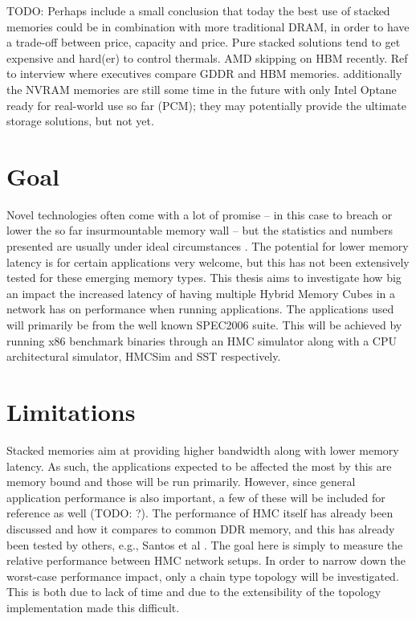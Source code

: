 TODO: Perhaps include a small conclusion that today the best use of stacked memories could be in combination with more traditional DRAM, in order to have a trade-off between price, capacity and price. Pure stacked solutions tend to get expensive and hard(er) to control thermals. AMD skipping on HBM recently. Ref to interview where executives compare GDDR and HBM memories. additionally the NVRAM memories are still some time in the future with only Intel Optane ready for real-world use so far (PCM); they may potentially provide the ultimate storage solutions, but not yet. 


\section{Goal}
Novel technologies often come with a lot of promise -- in this case to breach or lower the so far insurmountable memory wall -- but the statistics and numbers presented are usually under ideal circumstances \cite{Radulovic:2015:TWM:2818950.2818955}. The potential for lower memory latency is for certain applications very welcome, but this has not been extensively tested for these emerging memory types. This thesis aims to investigate how big an impact the increased latency of having multiple Hybrid Memory Cubes in a network has on performance when running applications. The applications used will primarily be from the well known SPEC2006 suite. This will be achieved by running x86 benchmark binaries through an HMC simulator along with a CPU architectural simulator, HMCSim and SST respectively. 

\section{Limitations}
Stacked memories aim at providing higher bandwidth along with lower memory latency. As such, the applications expected to be affected the most by this are memory bound and those will be run primarily. However, since general application performance is also important, a few of these will be included for reference as well (TODO: ?). The performance of HMC itself has already been discussed and how it compares to common DDR memory, and this has already been tested by others, e.g., Santos et al \cite{santosHMCvsDRAM2017}. The goal here is simply to measure the relative performance between HMC network setups. In order to narrow down the worst-case performance impact, only a chain type topology will be investigated. This is both due to lack of time and due to the extensibility of the topology implementation made this difficult.
\bigskip

